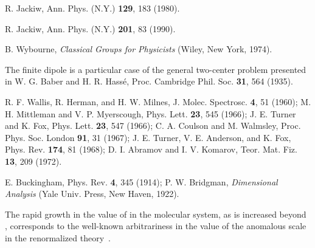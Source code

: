 \documentclass[a4paper,twocolumn,
showpacs,amssymb,aps,prl,superscriptaddress]{revtex4}%
\begin{document}
\begin{thebibliography}{99}
R. Jackiw, Ann. Phys. (N.Y.) {\bf 129}, 183 (1980).

R. Jackiw, Ann. Phys. (N.Y.) {\bf 201}, 83 (1990).

B. Wybourne, {\em Classical Groups for Physicists\/} (Wiley, New
York, 1974).

The finite dipole is a particular case of the general two-center
problem presented in W. G. Baber and H. R. Hass\'{e}, Proc.
Cambridge Phil. Soc. {\bf 31}, 564 (1935).

R. F. Wallis, R. Herman, and H. W. Milnes, J. Molec. Spectrosc.
{\bf 4}, 51 (1960); M. H. Mittleman and V. P. Myerscough, Phys.
Lett. {\bf 23}, 545 (1966);
 J. E. Turner and K. Fox,  Phys. Lett.  {\bf 23}, 547 (1966);
 C. A. Coulson and M. Walmsley, Proc. Phys. Soc.
London {\bf 91}, 31 (1967); J. E. Turner, V. E. Anderson, and K.
Fox, Phys. Rev. {\bf 174}, 81 (1968); D. I. Abramov and I. V.
Komarov, Teor. Mat. Fiz. {\bf 13}, 209 (1972).

E. Buckingham, Phys. Rev. {\bf 4}, 345 (1914); P. W. Bridgman,
{\em Dimensional Analysis\/} (Yale Univ. Press, New Haven, 1922).

The rapid growth in the value of \coordHE{}
in the molecular system, as \myHighlight{$\lambda$}\coordHE{} is increased beyond
\myHighlight{$\lambda^{(*)}$}\coordHE{}, 
corresponds to the well-known arbitrariness in the value 
of the anomalous scale in the renormalized theory~\cite{cam:00}.

\end{thebibliography}
\end{document}
